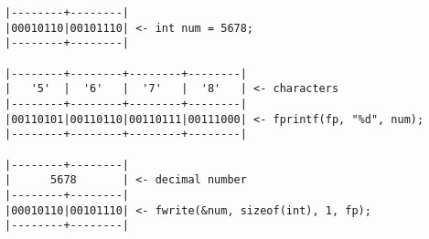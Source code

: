 \documentclass{article}
\begin{document}
\pagestyle{empty}

\begin{Verbatim}
|--------+--------|
|00010110|00101110| <- int num = 5678;
|--------+--------|
 
|--------+--------+--------+--------|
|   '5'  |  '6'   |  '7'   |  '8'   | <- characters
|--------+--------+--------+--------|
|00110101|00110110|00110111|00111000| <- fprintf(fp, "%d", num);
|--------+--------+--------+--------|

|--------+--------|
|      5678       | <- decimal number
|--------+--------|
|00010110|00101110| <- fwrite(&num, sizeof(int), 1, fp);
|--------+--------|
\end{Verbatim}
\end{document}
